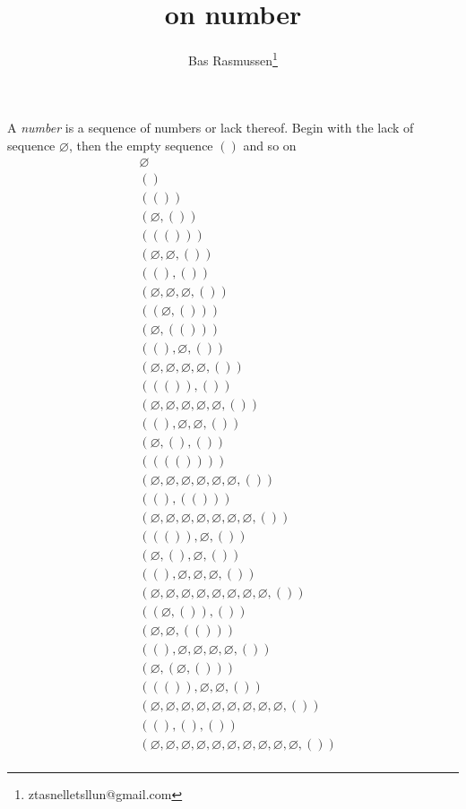 \documentclass[12pt]{article}
\title{on number}
\author{Bas Rasmussen\thanks{ztasnelletsllun@gmail.com}}
\def\qua{()}
\newcommand{\quat}[1]{\left( #1 \right)}
\def\nul{\varnothing}
\begin{document}
\maketitle

A \emph{number} is a sequence of numbers or lack thereof.  Begin with the lack of sequence $\nul$, then the empty sequence $\qua$ and so on
\begin{align*}
&\nul\\
&\qua\\
&\quat{\qua}\\
&\quat{\nul,\qua}\\
&\quat{\quat{\qua}}\\
&\quat{\nul,\nul,\qua}\\
&\quat{\qua,\qua}\\
&\quat{\nul,\nul,\nul,\qua}\\
&\quat{\quat{\nul,\qua}}\\
&\quat{\nul,\quat{\qua}}\\
&\quat{\qua,\nul,\qua}\\
&\quat{\nul,\nul,\nul,\nul,\qua}\\
&\quat{\quat{\qua},\qua}\\
&\quat{\nul,\nul,\nul,\nul,\nul,\qua}\\
&\quat{\qua,\nul,\nul,\qua}\\
&\quat{\nul,\qua,\qua}\\
&\quat{\quat{\quat{\qua}}}\\
&\quat{\nul,\nul,\nul,\nul,\nul,\nul,\qua}\\
&\quat{\qua,\quat{\qua}}\\
&\quat{\nul,\nul,\nul,\nul,\nul,\nul,\nul,\qua}\\
&\quat{\quat{\qua},\nul,\qua}\\
&\quat{\nul,\qua,\nul,\qua}\\
&\quat{\qua,\nul,\nul,\nul,\qua}\\
&\quat{\nul,\nul,\nul,\nul,\nul,\nul,\nul,\nul,\qua}\\
&\quat{\quat{\nul,\qua},\qua}\\
&\quat{\nul,\nul,\quat{\qua}}\\
&\quat{\qua,\nul,\nul,\nul,\nul,\qua}\\
&\quat{\nul,\quat{\nul,\qua}}\\
&\quat{\quat{\qua},\nul,\nul,\qua}\\
&\quat{\nul,\nul,\nul,\nul,\nul,\nul,\nul,\nul,\nul,\qua}\\
&\quat{\qua,\qua,\qua}\\
&\quat{\nul,\nul,\nul,\nul,\nul,\nul,\nul,\nul,\nul,\nul,\qua}\\

\end{align*}
\end{document}
